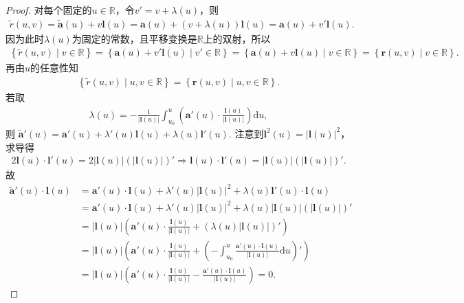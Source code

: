 \documentclass[../../main.tex]{subfiles}%
\begin{document}
\begin{proof}

对每个固定的$u\in\mathbb{R}$，令$v'=v+\lambda(u)$，则\begin{align*}
\tilde{r}(u,v)=\tilde{\bm{a}}(u)+v\bm{l}(u)=\bm{a}(u)+(v+\lambda(u))\bm{l}(u)=\bm{a}(u)+v'\bm{l}(u).
\end{align*}
因为此时$\lambda(u)$为固定的常数，且平移变换是$\mathbb{R}$上的双射，所以\begin{align*}
\left\{ \tilde{r}(u,v) \mid v\in\mathbb{R} \right\}=\left\{ \bm{a}(u)+v'\bm{l}(u) \mid v'\in\mathbb{R} \right\}=\left\{ \bm{a}(u)+v\bm{l}(u) \mid v\in\mathbb{R} \right\}=\left\{ \bm{r}(u,v) \mid v\in\mathbb{R} \right\}.
\end{align*}
再由$u$的任意性知\begin{align*}
\left\{ \tilde{r}(u,v) \mid u,v\in\mathbb{R} \right\}=\left\{ \bm{r}(u,v) \mid u,v\in\mathbb{R} \right\}.
\end{align*}
若取
\begin{align*}
\lambda(u)=-\frac{1}{|\bm{l}(u)|}\int_{u_0}^{u}\left(\bm{a}'(u)\cdot\frac{\bm{l}(u)}{|\bm{l}(u)|}\right)\mathrm{d}u,
\end{align*}
则
$\tilde{\bm{a}}'(u)=\bm{a}'(u)+\lambda'(u)\bm{l}(u)+\lambda(u)\bm{l}'(u).$
注意到$\bm{l}^2(u)=|\bm{l}(u)|^2$，求导得
\begin{align*}
2\bm{l}(u)\cdot\bm{l}'(u)=2|\bm{l}(u)|\left(|\bm{l}(u)|\right)'
\Longrightarrow
\bm{l}(u)\cdot\bm{l}'(u)=|\bm{l}(u)|\left(|\bm{l}(u)|\right)'.
\end{align*}
故\begin{align*}
\tilde{\bm{a}}'(u)\cdot\bm{l}(u)
&=\bm{a}'(u)\cdot\bm{l}(u)+\lambda'(u)|\bm{l}(u)|^2+\lambda(u)\bm{l}'(u)\cdot\bm{l}(u) \\
&=\bm{a}'(u)\cdot\bm{l}(u)+\lambda'(u)|\bm{l}(u)|^2+\lambda(u)|\bm{l}(u)|\left(|\bm{l}(u)|\right)' \\
&=|\bm{l}(u)|\left( \bm{a}'(u)\cdot\frac{\bm{l}(u)}{|\bm{l}(u)|}+\left( \lambda(u)|\bm{l}(u)| \right)' \right) \\
&=|\bm{l}(u)|\left( \bm{a}'(u)\cdot\frac{\bm{l}(u)}{|\bm{l}(u)|}+\left( -\int_{u_0}^u \frac{\bm{a}'(u)\cdot\bm{l}(u)}{|\bm{l}(u)|}\mathrm{d}u \right)' \right) \\
&=|\bm{l}(u)|\left( \bm{a}'(u)\cdot\frac{\bm{l}(u)}{|\bm{l}(u)|}-\frac{\bm{a}'(u)\cdot\bm{l}(u)}{|\bm{l}(u)|} \right) =0.
\end{align*}

\end{proof}
\end{document}
